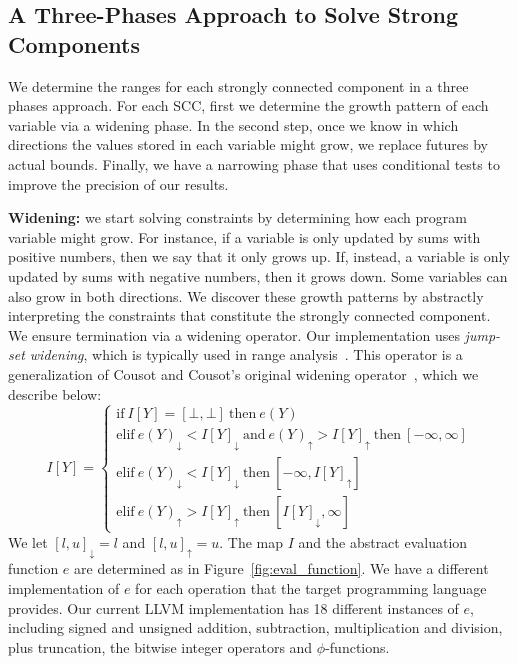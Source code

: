 \documentclass[preprint]{sigplanconf}[10pt]
\newcommand{\lb}[1]{#1_{\downarrow}}
\newcommand{\ub}[1]{#1_{\uparrow}}
\begin{document}
\subsection{A Three-Phases Approach to Solve Strong Components}
\label{sub:micro}

We determine the ranges for each strongly connected component in a three phases
approach.
For each SCC, first we determine the growth pattern of each variable via a
widening phase.
In the second step, once we know in which directions the values stored in each
variable might grow, we replace futures by actual bounds.
Finally, we have a narrowing phase that uses conditional tests to improve the
precision of our results.

\noindent
\textbf{Widening: } we start solving constraints by determining how each program
variable might grow.
For instance, if a variable is only updated by sums with positive numbers, then
we say that it only grows up.
If, instead, a variable is only updated by sums with negative numbers, then it
grows down.
Some variables can also grow in both directions.
We discover these growth patterns by abstractly interpreting the constraints that
constitute the strongly connected component.
We ensure termination via a widening operator.
Our implementation uses {\em jump-set widening}, which is typically used in
range analysis~\cite[p.228]{Nielson99}.
This operator is a generalization of Cousot and Cousot's original widening
operator~\cite{Cousot77}, which we describe below:
%
\begin{equation*}
I[Y] =
\begin{cases}
\mbox{if} \ I[Y] = [\bot, \bot] \ \mbox{then} \ e(Y) \\
\mbox{elif} \ \lb{e(Y)} < \lb{I[Y]}  \ \mbox{and} \ \ub{e(Y)} > \ub{I[Y]} \ \mbox{then} \ [-\infty, \infty] \\
\mbox{elif} \ \lb{e(Y)} < \lb{I[Y]} \ \mbox{then} \ [-\infty, \ub{I[Y]}] \\
\mbox{elif} \ \ub{e(Y)} > \ub{I[Y]} \ \mbox{then} \ [\lb{I[Y]}, \infty]
\end{cases}
\end{equation*}
%
We let $\lb{[l, u]} = l$ and $\ub{[l, u]} = u$.
The map $I$ and the abstract evaluation function $e$ are determined as in
Figure~\ref{fig:eval_function}.
We have a different implementation of $e$ for each operation that the
target programming language provides.
Our current LLVM implementation has 18 different instances of $e$, including
signed and unsigned addition, subtraction, multiplication and division, plus
truncation, the bitwise integer operators and $\phi$-functions.
\end{document}
